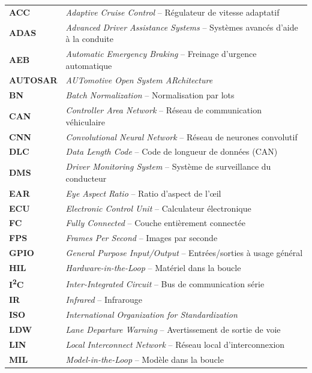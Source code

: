 \documentclass[12pt,a4paper,twoside]{report}
\begin{document}
\begin{longtable}{@{} >{\bfseries}l @{\hspace{2cm}} l @{}}
ACC     & \textit{Adaptive Cruise Control} -- Régulateur de vitesse adaptatif \\[0.2cm]
ADAS    & \textit{Advanced Driver Assistance Systems} -- Systèmes avancés d'aide à la conduite \\[0.2cm]
AEB     & \textit{Automatic Emergency Braking} -- Freinage d'urgence automatique \\[0.2cm]
AUTOSAR & \textit{AUTomotive Open System ARchitecture} \\[0.2cm]
BN      & \textit{Batch Normalization} -- Normalisation par lots \\[0.2cm]
CAN     & \textit{Controller Area Network} -- Réseau de communication véhiculaire \\[0.2cm]
CNN     & \textit{Convolutional Neural Network} -- Réseau de neurones convolutif \\[0.2cm]
DLC     & \textit{Data Length Code} -- Code de longueur de données (CAN) \\[0.2cm]
DMS     & \textit{Driver Monitoring System} -- Système de surveillance du conducteur \\[0.2cm]
EAR     & \textit{Eye Aspect Ratio} -- Ratio d'aspect de l'œil \\[0.2cm]
ECU     & \textit{Electronic Control Unit} -- Calculateur électronique \\[0.2cm]
FC      & \textit{Fully Connected} -- Couche entièrement connectée \\[0.2cm]
FPS     & \textit{Frames Per Second} -- Images par seconde \\[0.2cm]
GPIO    & \textit{General Purpose Input/Output} -- Entrées/sorties à usage général \\[0.2cm]
HIL     & \textit{Hardware-in-the-Loop} -- Matériel dans la boucle \\[0.2cm]
I\textsuperscript{2}C & \textit{Inter-Integrated Circuit} -- Bus de communication série \\[0.2cm]
IR      & \textit{Infrared} -- Infrarouge \\[0.2cm]
ISO     & \textit{International Organization for Standardization} \\[0.2cm]
LDW     & \textit{Lane Departure Warning} -- Avertissement de sortie de voie \\[0.2cm]
LIN     & \textit{Local Interconnect Network} -- Réseau local d'interconnexion \\[0.2cm]
MIL     & \textit{Model-in-the-Loop} -- Modèle dans la boucle \\[0.2cm]

\end{longtable}
\end{document}
